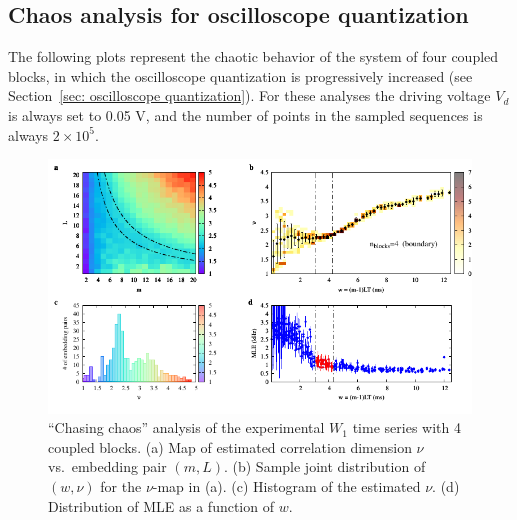 \begin{appendices}

\chapter{Chaos analysis for oscilloscope quantization}\label{app: quantization}

The following plots represent the chaotic behavior of the system of four coupled blocks,
in which the oscilloscope quantization is progressively increased
(see Section~\ref{sec: oscilloscope quantization}).
For these analyses the driving voltage $V_d$ is always set to 0.05 V, and the number of points
in the sampled sequences is always $2\times 10^5$.
\begin{figure}[!htbp]
    \centering
    \includegraphics[width=\linewidth]{../blocks/4_blocks/2e5_points_new/plots/chaos_low.pdf}
    \caption{``Chasing chaos'' analysis of the experimental $W_1$ time series with 4 coupled blocks.
    (a) Map of estimated correlation dimension $\nu$ vs.\ embedding pair $(m, L)$.
    (b) Sample joint distribution of $(w,\nu)$ for the $\nu$-map in (a).
    (c) Histogram of the estimated $\nu$. (d) Distribution of MLE as a function of $w$.
    }\label{fig:4 blocks chaos}
\end{figure}


\end{appendices}
